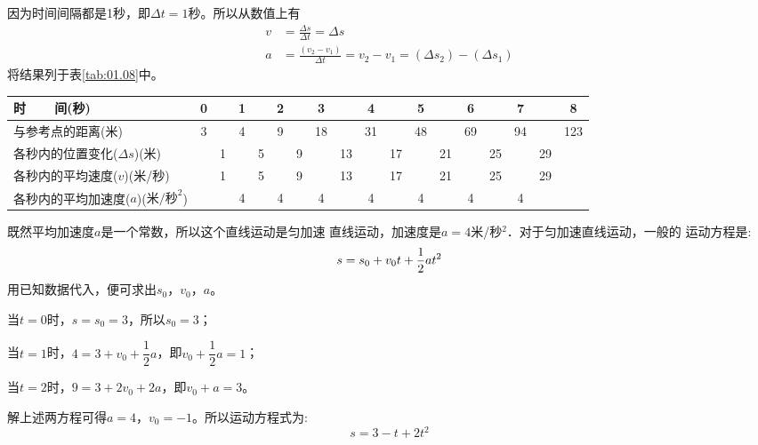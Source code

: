 \solution 因为时间间隔都是1秒，即$\Delta t=1$秒。所以从数值上有
\begin{align*}
    v & =\frac{\Delta s}{\Delta t}=\Delta s                         \\
    a & =\frac{(v_2-v_1)}{\Delta t}=v_2-v_1=(\Delta s_2)-(\Delta s_1)
\end{align*}
将结果列于表\ref{tab:01.08}中。
\begin{tablex}[!h]{0.2mm}
        \caption{}
        \label{tab:01.08}
        \centering {}
        \begin{tabular}{l|c|c|c|c|c|c|c|c|c|c|c|c|c|c|c|c|c}
            \toprule
            时~~~~间(秒)                              & 0 &   & 1 &   & 2 &   & 3  &    & 4  &    & 5  &    & 6  &    & 7  &    & 8   \\
            \midrule
            与参考点的距离(米)                        & 3 &   & 4 &   & 9 &   & 18 &    & 31 &    & 48 &    & 69 &    & 94 &    & 123 \\
            各秒内的位置变化($\Delta s$)(米)          &   & 1 &   & 5 &   & 9 &    & 13 &    & 17 &    & 21 &    & 25 &    & 29 &     \\
            各秒内的平均速度($v$)(米/秒)              &   & 1 &   & 5 &   & 9 &    & 13 &    & 17 &    & 21 &    & 25 &    & 29 &     \\
            各秒内的平均加速度($a$)($\text{米/秒}^2$) &   &   & 4 &   & 4 &   & 4  &    & 4  &    & 4  &    & 4  &    & 4  &    &     \\
            \bottomrule
        \end{tabular}
\end{tablex}
\clearpage
既然平均加速度$a$是一个常数，所以这个直线运动是匀加速
直线运动，加速度是$a=4$米/秒$^2$．对于匀加速直线运动，一般的
运动方程是:
\begin{equation*}
    s=s_0+v_{0}t+\frac{1}{2}at^2 \vspace{-0.5em}
\end{equation*}
用已知数据代入，便可求出$s_0$，$v_0$，$a$。

当$t=0$时，$s=s_0=3$，所以$s_0=3$；

当$t=1$时，$4=3+v_0+\dfrac 1 2 a$，即$v_0+\dfrac 1 2 a=1$；

当$t=2$时，$9=3+2v_0+2a$，即$v_0+a=3$。

解上述两方程可得$a=4$，$v_0=-1$。所以运动方程式为:
\begin{equation*}
    s=3-t+2t^2
\end{equation*}


